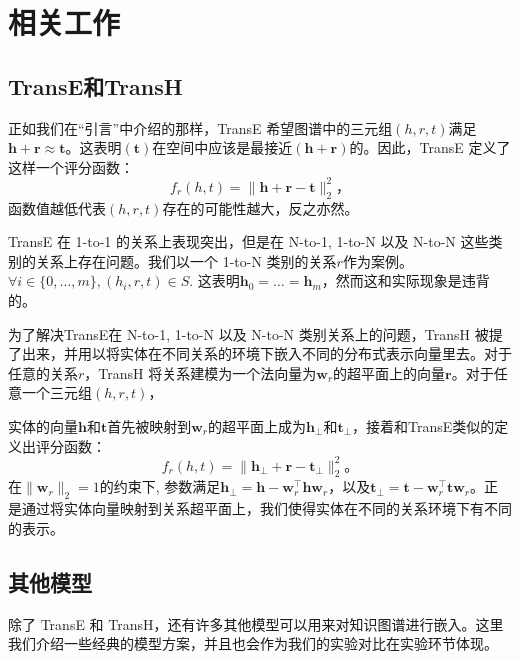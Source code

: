 \section{相关工作}

    \subsection{TransE和TransH}

    正如我们在``引言''中介绍的那样，TransE \cite{bordes2013translating} 希望图谱中的三元组$(h, r, t)$满足$\mathbf{h} + \mathbf{r} \approx \mathbf{t}$。这表明$(\mathbf{t})$在空间中应该是最接近$(\mathbf{h} + \mathbf{r})$的。因此，TransE 定义了这样一个评分函数：
    \begin{equation}
    f_{r}(h, t) = \|\mathbf{h} + \mathbf{r} - \mathbf{t}\|_{2}^{2}，
    \end{equation}
    函数值越低代表$(h, r, t)$存在的可能性越大，反之亦然。

    TransE 在 1-to-1 的关系上表现突出，但是在 N-to-1, 1-to-N 以及 N-to-N 这些类别的关系上存在问题。我们以一个 1-to-N 类别的关系$r$作为案例。$\forall i \in \{0, \ldots, m\}, (h_i, r, t) \in S$. 这表明$\mathbf{h}_0 = \ldots = \mathbf{h}_m$，然而这和实际现象是违背的。

    为了解决TransE在 N-to-1, 1-to-N 以及 N-to-N 类别关系上的问题，TransH \cite{wang2014knowledge} 被提了出来，并用以将实体在不同关系的环境下嵌入不同的分布式表示向量里去。对于任意的关系$r$，TransH 将关系建模为一个法向量为$\mathbf{w}_r$的超平面上的向量$\mathbf{r}$。对于任意一个三元组$(h, r, t)$，



    实体的向量$\mathbf{h}$和$\mathbf{t}$首先被映射到$\mathbf{w}_r$的超平面上成为$\mathbf{h}_{\bot}$和$\mathbf{t}_{\bot}$，接着和TransE类似的定义出评分函数：
    \begin{equation}
    f_{r}(h, t) = \|\mathbf{h}_{\bot} + \mathbf{r} - \mathbf{t}_{\bot}\|_{2}^{2}。
    \end{equation}
    在$\|\mathbf{w}_r\|_{2} = 1$的约束下, 参数满足$\mathbf{h}_{\bot} = \mathbf{h} - \mathbf{w}_{r}^{\top}\mathbf{h}\mathbf{w}_{r}$，以及$\mathbf{t}_{\bot} = \mathbf{t} - \mathbf{w}_{r}^{\top}\mathbf{t}\mathbf{w}_{r}$。正是通过将实体向量映射到关系超平面上，我们使得实体在不同的关系环境下有不同的表示。


    \subsection{其他模型}
    除了 TransE 和 TransH，还有许多其他模型可以用来对知识图谱进行嵌入。这里我们介绍一些经典的模型方案，并且也会作为我们的实验对比在实验环节体现。


